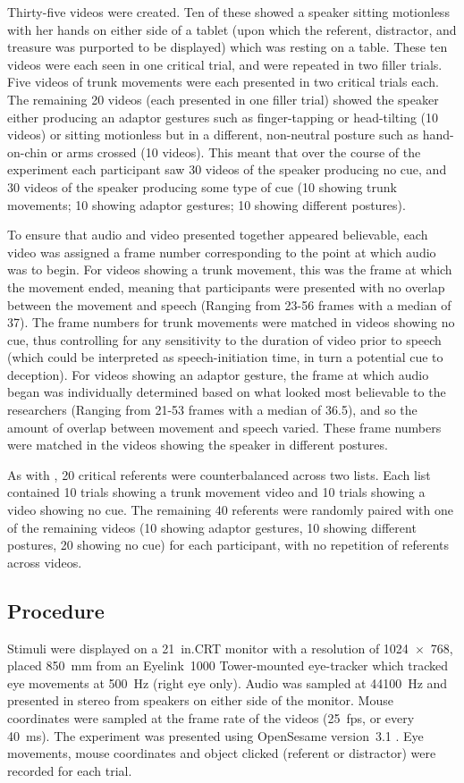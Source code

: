 \documentclass[a4paper,man,natbib]{apa6}
\begin{document}
Thirty-five videos were created.
Ten of these showed a speaker sitting motionless with her hands on either side of a tablet (upon which the referent, distractor, and treasure was purported to be displayed) which was resting on a table.
These ten videos were each seen in one critical trial, and were repeated in two filler trials.
Five videos of trunk movements were each presented in two critical trials each.
The remaining 20 videos (each presented in one filler trial) showed the speaker either producing an adaptor gestures such as finger-tapping or head-tilting (10 videos) or sitting motionless but in a different, non-neutral posture such as hand-on-chin or arms crossed (10 videos).
This meant that over the course of the experiment each participant saw 30 videos of the speaker producing no cue, and 30 videos of the speaker producing some type of cue (10 showing trunk movements; 10 showing adaptor gestures; 10 showing different postures).

To ensure that audio and video presented together appeared believable, each video was assigned a frame number corresponding to the point at which audio was to begin.
For videos showing a trunk movement, this was the frame at which the movement ended, meaning that participants were presented with no overlap between the movement and speech (Ranging from 23-56 frames with a median of 37). 
The frame numbers for trunk movements were matched in videos showing no cue, thus controlling for any sensitivity to the duration of video prior to speech (which could be interpreted as speech-initiation time, in turn a potential cue to deception). 
For videos showing an adaptor gesture, the frame at which audio began was individually determined based on what looked most believable to the researchers (Ranging from 21-53 frames with a median of 36.5), and so the amount of overlap between movement and speech varied.
These frame numbers were matched in the videos showing the speaker in different postures.

As with \citet{Loy2017}, 20 critical referents were counterbalanced across two lists. 
Each list contained 10 trials showing a trunk movement video and 10 trials showing a video showing no cue.
The remaining 40 referents were randomly paired with one of the remaining videos (10 showing adaptor gestures, 10 showing different postures, 20 showing no cue) for each participant, with no repetition of referents across videos.

\subsection{Procedure}
Stimuli were displayed on a 21~in.\@ CRT monitor with a resolution of 1024~$\times$~768, placed 850~mm from an Eyelink~1000 Tower-mounted eye-tracker which tracked eye movements at 500~Hz (right eye only). 
Audio was sampled at 44100~Hz and presented in stereo from speakers on either side of the monitor. 
Mouse coordinates were sampled at the frame rate of the videos (25~fps, or every 40~ms).
The experiment was presented using OpenSesame version~3.1 \citep{Mathot2012}.
Eye movements, mouse coordinates and object clicked (referent or distractor) were recorded for each trial.
\end{document}
